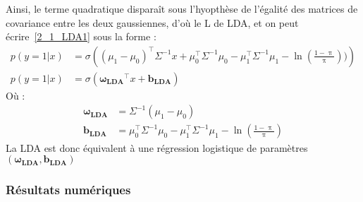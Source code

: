 \documentclass[12pt,a4paper,onecolumn]{article}
\begin{document}
Ainsi, le terme quadratique disparaît sous l'hyopthèse de l'égalité des matrices de covariance entre les deux gaussiennes, d'où le L de LDA, et on peut écrire~\eqref{2_1_LDA1} sous la forme :
\begin{equation}
	\begin{split}
		p(y = 1 | x) &= \sigma\left((\mu_1 - \mu_0)^\intercal\Sigma^{-1}x + \mu_0^\intercal\Sigma^{-1}\mu_0 - \mu_1^\intercal\Sigma^{-1}\mu_1 - \ln(\frac{1 - \uppi}{\uppi}))\right) \\
		p(y = 1 | x) &= \sigma\left(\bm{\omega_{LDA}}^\intercal x + \bm{b_{LDA}}\right)
	\end{split}
\end{equation}
Où :
\begin{equation}
	\begin{split}
		\bm{\omega_{LDA}} & = \Sigma^{-1} (\mu_1 - \mu_0)\\
		\bm{b_{LDA}} &= \mu_0^\intercal\Sigma^{-1}\mu_0 - \mu_1^\intercal\Sigma^{-1}\mu_1 - \ln(\frac{1 - \uppi}{\uppi})
	\end{split}
\end{equation}
La LDA est donc équivalent à une régression logistique de paramètres \((\bm{\omega_{LDA}}, \bm{b_{LDA}}) \)

\subsubsection{Résultats numériques}
\end{document}
